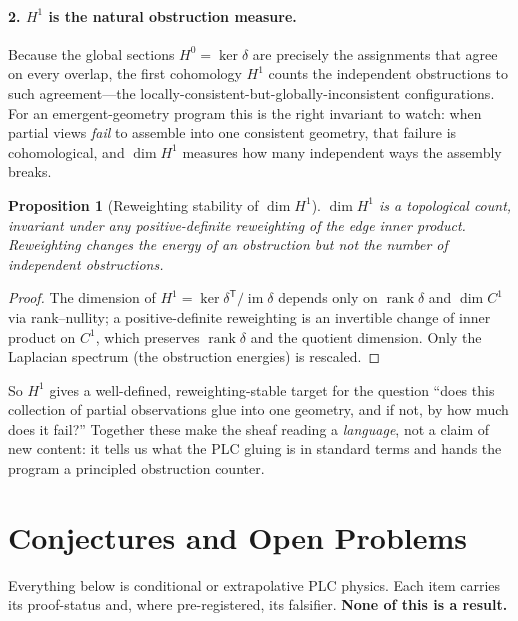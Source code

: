 \documentclass[aps,pra,twocolumn,superscriptaddress,floatfix]{revtex4-2}
\newtheorem{proposition}{Proposition}
\theoremstyle{definition}
\begin{document}
\paragraph{2. $H^1$ is the natural obstruction measure.}
Because the global sections $H^0=\ker\delta$ are precisely the assignments that
agree on every overlap, the first cohomology $H^1$ counts the independent
obstructions to such agreement---the locally-consistent-but-globally-inconsistent
configurations. For an emergent-geometry program this is the right invariant to
watch: when partial views \emph{fail} to assemble into one consistent geometry,
that failure is cohomological, and $\dim H^1$ measures how many independent ways
the assembly breaks.

\begin{proposition}[Reweighting stability of $\dim H^1$]
$\dim H^1$ is a topological count, invariant under any positive-definite
reweighting of the edge inner product. Reweighting changes the \emph{energy} of
an obstruction but not the \emph{number} of independent obstructions.
\end{proposition}

\begin{proof}
The dimension of $H^1=\ker\delta^{\mathsf T}/\operatorname{im}\delta$ depends
only on $\operatorname{rank}\delta$ and $\dim C^1$ via rank--nullity; a
positive-definite reweighting is an invertible change of inner product on $C^1$,
which preserves $\operatorname{rank}\delta$ and the quotient dimension. Only the
Laplacian spectrum (the obstruction energies) is rescaled.
\end{proof}

So $H^1$ gives a well-defined, reweighting-stable target for the question ``does
this collection of partial observations glue into one geometry, and if not, by
how much does it fail?'' Together these make the sheaf reading a \emph{language},
not a claim of new content: it tells us what the PLC gluing is in standard terms
and hands the program a principled obstruction counter.

\section{Conjectures and Open Problems}
\label{sec:conjectures}

Everything below is conditional or extrapolative PLC physics. Each item carries
its proof-status and, where pre-registered, its falsifier. \textbf{None of this
is a result.}
\end{document}
